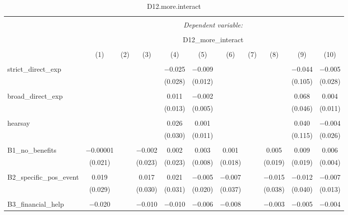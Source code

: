 
\begin{table}[H] \centering 
  \caption{D12.more.interact} 
  \label{} 
\tiny 
\begin{tabular}{@{\extracolsep{4pt}}lcccccccccc} 
\\[-1.8ex]\hline 
\hline \\[-1.8ex] 
 & \multicolumn{10}{c}{\textit{Dependent variable:}} \\ 
\cline{2-11} 
\\[-1.8ex] & \multicolumn{10}{c}{D12\_more\_interact} \\ 
\\[-1.8ex] & (1) & (2) & (3) & (4) & (5) & (6) & (7) & (8) & (9) & (10)\\ 
\hline \\[-1.8ex] 
 strict\_direct\_exp &  &  &  & $-$0.025 & $-$0.009 &  &  &  & $-$0.044 & $-$0.005 \\ 
  &  &  &  & (0.028) & (0.012) &  &  &  & (0.105) & (0.028) \\ 
  & & & & & & & & & & \\ 
 broad\_direct\_exp &  &  &  & 0.011 & $-$0.002 &  &  &  & 0.068 & 0.004 \\ 
  &  &  &  & (0.013) & (0.005) &  &  &  & (0.046) & (0.011) \\ 
  & & & & & & & & & & \\ 
 hearsay &  &  &  & 0.026 & 0.001 &  &  &  & 0.040 & $-$0.004 \\ 
  &  &  &  & (0.030) & (0.011) &  &  &  & (0.115) & (0.026) \\ 
  & & & & & & & & & & \\ 
 B1\_no\_benefits & $-$0.00001 &  & $-$0.002 & 0.002 & 0.003 & 0.001 &  & 0.005 & 0.009 & 0.006 \\ 
  & (0.021) &  & (0.023) & (0.023) & (0.008) & (0.018) &  & (0.019) & (0.019) & (0.004) \\ 
  & & & & & & & & & & \\ 
 B2\_specific\_pos\_event & 0.019 &  & 0.017 & 0.021 & $-$0.005 & $-$0.007 &  & $-$0.015 & $-$0.012 & $-$0.007 \\ 
  & (0.029) &  & (0.030) & (0.031) & (0.020) & (0.037) &  & (0.038) & (0.040) & (0.013) \\ 
  & & & & & & & & & & \\ 
 B3\_financial\_help & $-$0.020 &  & $-$0.010 & $-$0.010 & $-$0.006 & $-$0.008 &  & $-$0.003 & $-$0.005 & $-$0.004 \\ 

\end{tabular}
\end{table}
